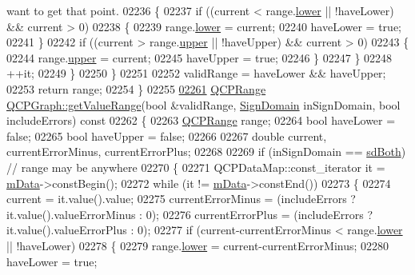 \begin{DoxyCode}
{       want to get that point.}
02236       \{
02237         \textcolor{keywordflow}{if} ((current < range.\hyperlink{a00049_aa3aca3edb14f7ca0c85d912647b91745}{lower} || !haveLower) && current > 0)
02238         \{
02239           range.\hyperlink{a00049_aa3aca3edb14f7ca0c85d912647b91745}{lower} = current;
02240           haveLower = \textcolor{keyword}{true};
02241         \}
02242         \textcolor{keywordflow}{if} ((current > range.\hyperlink{a00049_ae44eb3aafe1d0e2ed34b499b6d2e074f}{upper} || !haveUpper) && current > 0)
02243         \{
02244           range.\hyperlink{a00049_ae44eb3aafe1d0e2ed34b499b6d2e074f}{upper} = current;
02245           haveUpper = \textcolor{keyword}{true};
02246         \}
02247       \}
02248       ++it;
02249     \}
02250   \}
02251   
02252   validRange = haveLower && haveUpper;
02253   \textcolor{keywordflow}{return} range;
02254 \}
02255 
\hypertarget{a00115_source_l02261}{}\hyperlink{a00031_acdb1e7bb86fea2764b0adb104185832b}{02261} \hyperlink{a00049}{QCPRange} \hyperlink{a00031_a9fc0c1288455fa5bb64b603d6b01de6c}{QCPGraph::getValueRange}(\textcolor{keywordtype}{bool} &validRange, 
      \hyperlink{a00024_a661743478a1d3c09d28ec2711d7653d8}{SignDomain} inSignDomain, \textcolor{keywordtype}{bool} includeErrors)\textcolor{keyword}{ const}
02262 \textcolor{keyword}{}\{
02263   \hyperlink{a00049}{QCPRange} range;
02264   \textcolor{keywordtype}{bool} haveLower = \textcolor{keyword}{false};
02265   \textcolor{keywordtype}{bool} haveUpper = \textcolor{keyword}{false};
02266   
02267   \textcolor{keywordtype}{double} current, currentErrorMinus, currentErrorPlus;
02268   
02269   \textcolor{keywordflow}{if} (inSignDomain == \hyperlink{a00024_a661743478a1d3c09d28ec2711d7653d8a082b98cfb91a7363a3b5cd17b0c1cd60}{sdBoth}) \textcolor{comment}{// range may be anywhere}
02270   \{
02271     QCPDataMap::const\_iterator it = \hyperlink{a00031_a8457c840f69a0ac49f61d30a509c5d08}{mData}->constBegin();
02272     \textcolor{keywordflow}{while} (it != \hyperlink{a00031_a8457c840f69a0ac49f61d30a509c5d08}{mData}->constEnd())
02273     \{
02274       current = it.value().value;
02275       currentErrorMinus = (includeErrors ? it.value().valueErrorMinus : 0);
02276       currentErrorPlus = (includeErrors ? it.value().valueErrorPlus : 0);
02277       \textcolor{keywordflow}{if} (current-currentErrorMinus < range.\hyperlink{a00049_aa3aca3edb14f7ca0c85d912647b91745}{lower} || !haveLower)
02278       \{
02279         range.\hyperlink{a00049_aa3aca3edb14f7ca0c85d912647b91745}{lower} = current-currentErrorMinus;
02280         haveLower = \textcolor{keyword}{true};

\end{DoxyCode}
